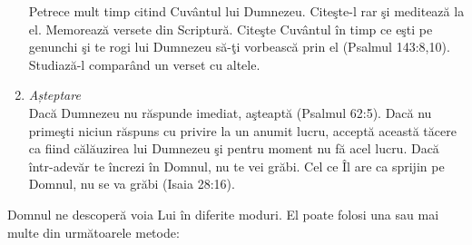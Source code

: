 \begin{enumerate}
	Petrece mult timp citind Cuvântul lui Dumnezeu. Citeşte-l rar şi meditează la el. Memorează versete din Scriptură. Citeşte Cuvântul în timp ce eşti pe genunchi şi te rogi lui Dumnezeu să-ţi vorbească prin el (Psalmul 143:8,10). Studiază-l comparând un verset cu altele.
	
	\item \textit{Așteptare} \\
	
	Dacă Dumnezeu nu răspunde imediat, aşteaptă (Psalmul 62:5). Dacă nu primeşti niciun răspuns cu privire la un anumit lucru, acceptă această tăcere ca fiind călăuzirea lui Dumnezeu şi pentru moment nu fă acel lucru. Dacă într-adevăr te încrezi în Domnul, nu te vei grăbi. Cel ce Îl are ca sprijin pe Domnul, nu se va grăbi (Isaia 28:16). 
	
\end{enumerate}

Domnul ne descoperă voia Lui în diferite moduri. El poate folosi una sau mai multe din următoarele metode:

